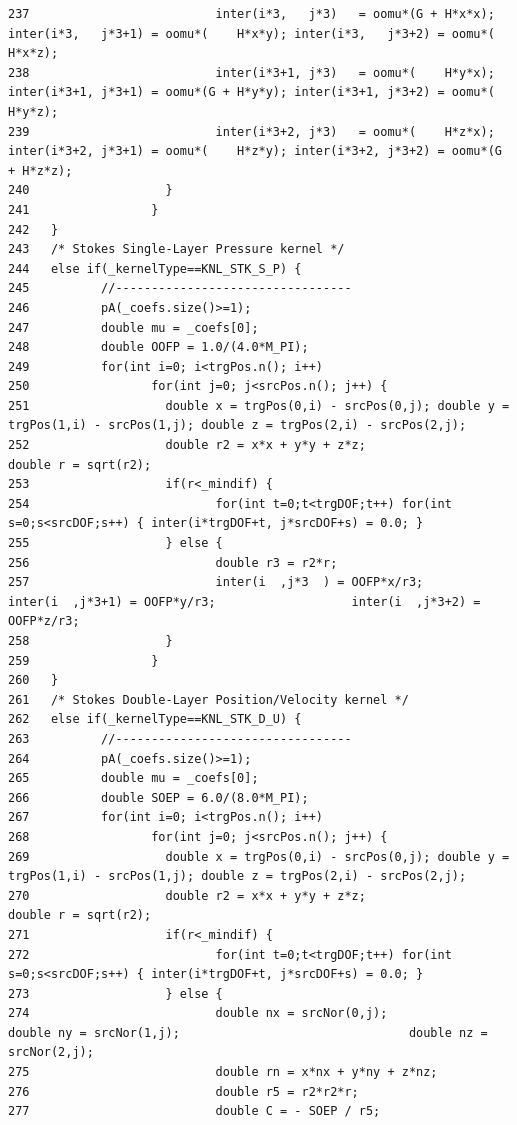 \begin{verbatim}
237                          inter(i*3,   j*3)   = oomu*(G + H*x*x); inter(i*3,   j*3+1) = oomu*(    H*x*y); inter(i*3,   j*3+2) = oomu*(    H*x*z);
238                          inter(i*3+1, j*3)   = oomu*(    H*y*x); inter(i*3+1, j*3+1) = oomu*(G + H*y*y); inter(i*3+1, j*3+2) = oomu*(    H*y*z);
239                          inter(i*3+2, j*3)   = oomu*(    H*z*x); inter(i*3+2, j*3+1) = oomu*(    H*z*y); inter(i*3+2, j*3+2) = oomu*(G + H*z*z);
240                   }
241                 }
242   }
243   /* Stokes Single-Layer Pressure kernel */
244   else if(_kernelType==KNL_STK_S_P) {
245          //---------------------------------
246          pA(_coefs.size()>=1);
247          double mu = _coefs[0];
248          double OOFP = 1.0/(4.0*M_PI);
249          for(int i=0; i<trgPos.n(); i++)
250                 for(int j=0; j<srcPos.n(); j++) {
251                   double x = trgPos(0,i) - srcPos(0,j); double y = trgPos(1,i) - srcPos(1,j); double z = trgPos(2,i) - srcPos(2,j);
252                   double r2 = x*x + y*y + z*z;                    double r = sqrt(r2);
253                   if(r<_mindif) {
254                          for(int t=0;t<trgDOF;t++) for(int s=0;s<srcDOF;s++) { inter(i*trgDOF+t, j*srcDOF+s) = 0.0; }
255                   } else {
256                          double r3 = r2*r;
257                          inter(i  ,j*3  ) = OOFP*x/r3;                   inter(i  ,j*3+1) = OOFP*y/r3;                   inter(i  ,j*3+2) = OOFP*z/r3;
258                   }
259                 }
260   }
261   /* Stokes Double-Layer Position/Velocity kernel */
262   else if(_kernelType==KNL_STK_D_U) {
263          //---------------------------------
264          pA(_coefs.size()>=1);
265          double mu = _coefs[0];
266          double SOEP = 6.0/(8.0*M_PI);
267          for(int i=0; i<trgPos.n(); i++)
268                 for(int j=0; j<srcPos.n(); j++) {
269                   double x = trgPos(0,i) - srcPos(0,j); double y = trgPos(1,i) - srcPos(1,j); double z = trgPos(2,i) - srcPos(2,j);
270                   double r2 = x*x + y*y + z*z;                    double r = sqrt(r2);
271                   if(r<_mindif) {
272                          for(int t=0;t<trgDOF;t++) for(int s=0;s<srcDOF;s++) { inter(i*trgDOF+t, j*srcDOF+s) = 0.0; }
273                   } else {
274                          double nx = srcNor(0,j);                                 double ny = srcNor(1,j);                                double nz = srcNor(2,j);
275                          double rn = x*nx + y*ny + z*nz;
276                          double r5 = r2*r2*r;
277                          double C = - SOEP / r5;

\end{verbatim}
